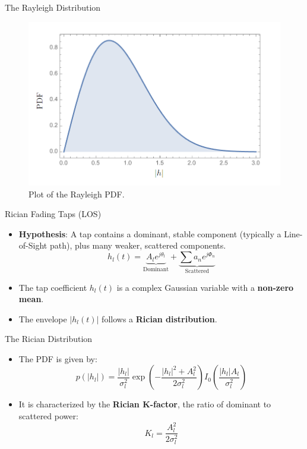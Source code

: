 \documentclass{beamer}
\begin{document}
	\begin{frame}{The Rayleigh Distribution}
		\begin{figure}
			\centering
			\includegraphics[width=0.7\linewidth]{"pictures/rayleigh-pdf.png"}
			\caption{Plot of the Rayleigh PDF.}
		\end{figure}
	\end{frame}
	
	\begin{frame}{Rician Fading Taps (LOS)}
		\begin{itemize}
			\item \textbf{Hypothesis}: A tap contains a dominant, stable component (typically a Line-of-Sight path), plus many weaker, scattered components.
			\[ h_l(t) = \underbrace{A_l e^{j\theta_l}}_{\text{Dominant}} + \underbrace{\sum a_n e^{j\Phi_n}}_{\text{Scattered}} \]
			
			\item The tap coefficient $h_l(t)$ is a complex Gaussian variable with a \textbf{non-zero mean}.
			
			\item The envelope $|h_l(t)|$ follows a \textbf{Rician distribution}.
		\end{itemize}
	\end{frame}
	
	\begin{frame}{The Rician Distribution}
		\begin{itemize}
			\item The PDF is given by:
			\[ p(|h_l|) = \frac{|h_l|}{\sigma_l^2} \exp\left(-\frac{|h_l|^2 + A_l^2}{2\sigma_l^2}\right) I_0\left(\frac{|h_l|A_l}{\sigma_l^2}\right) \]
			
			\item It is characterized by the \textbf{Rician K-factor}, the ratio of dominant to scattered power:
			\[ K_l = \frac{A_l^2}{2\sigma_l^2} \]
		\end{itemize}
	\end{frame}
	
\end{document}
